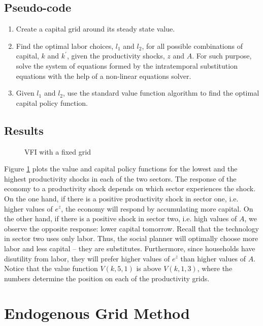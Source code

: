 \documentclass[11pt,a4paper]{article}
\newcommand{\goodgap}{ \hspace{\subfigtopskip} \hspace{\subfigbottomskip}}
\begin{document}
\subsection*{Pseudo-code}
\begin{enumerate}
\item Create a capital grid around its steady state value.
\item Find the optimal labor choices, $l_1$ and $l_2$, for all possible combinations of capital, $k$ and $k^{\prime}$, given the productivity shocks, $z$ and $A$. For such purpose, solve the system of equations formed by the intratemporal substitution equations with the help of a non-linear equations solver.
\item Given $l_1$ and $l_2$, use the standard value function algorithm to find the optimal capital policy function. 
\end{enumerate}

\subsection*{Results}

\begin{figure}[h]
\centering
{}
\goodgap
{}
\caption{VFI with a fixed grid}
\label{VFI_fixedGrid}
\end{figure}

Figure \ref{VFI_fixedGrid} plots the value and capital policy functions for the lowest and the highest productivity shocks in each of the two sectors. The response of the economy to a productivity shock depends on which sector experiences the shock. On the one hand, if there is a positive productivity shock in sector one, i.e. higher values of $e^{z}$, the economy will respond by accumulating more capital. On the other hand, if there is a positive shock in sector two, i.e. high values of $A$, we observe the opposite response: lower capital tomorrow. Recall that the technology in sector two uses only labor. Thus, the social planner will optimally choose more labor and less capital -- they are substitutes. Furthermore, since households have disutility from labor, they will prefer higher values of $e^z$ than higher values of $A$. Notice that the value function $V(k,5,1)$ is above $V(k,1,3)$, where the numbers determine the position on each of the productivity grids. 

\section{Endogenous Grid Method}
\end{document}
